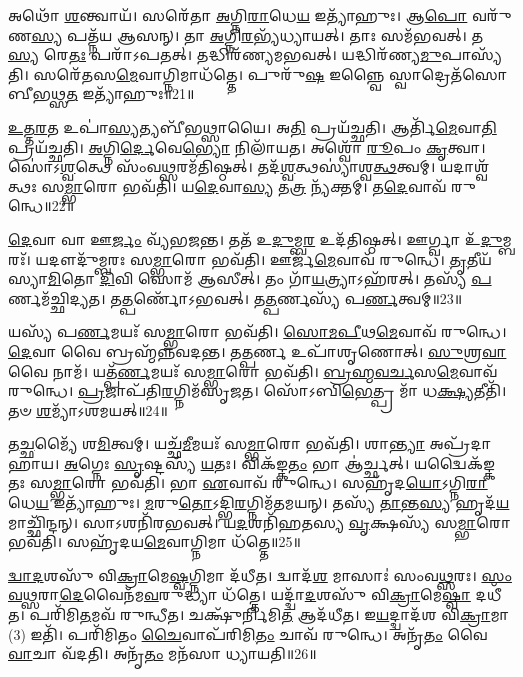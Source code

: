 𑌅𑌥𑍋᳴ \ul{𑌶}\-𑌨𑍍𑌤𑍍𑌵𑌾𑌯᳴।
𑌸𑌰𑍇᳴𑌤𑌾 \ul{𑌅}\-𑌗𑍍𑌨𑌿\-\ul{𑌰𑌾}\-𑌧𑍇\-\ul{𑌯} 𑌇𑌤𑍍𑌯𑌾᳴𑌹𑍁𑌃।
𑌆\-\ul{𑌪𑍋} 𑌵𑌰𑍁᳴𑌣\-\ul{𑌸𑍍𑌯} 𑌪𑌤𑍍𑌨᳴𑌯 𑌆𑌸𑌨𑍍।
𑌤𑌾 \ul{𑌅}\-𑌗𑍍𑌨𑌿\-\ul{𑌰}\-𑌭𑍍𑌯᳴𑌧𑍍𑌯𑌾𑌯𑌤𑍍।
𑌤𑌾𑌃 𑌸𑌮᳴𑌭𑌵𑌤𑍍।
𑌤\-\ul{𑌸𑍍𑌯} 𑌰𑍇\-\ul{𑌤𑌃} 𑌪𑌰𑌾᳴𑌽𑌪𑌤𑌤𑍍।
𑌤𑌦𑍍𑌧𑌿𑌰᳴𑌣𑍍𑌯𑌮𑌭𑌵𑌤𑍍।
𑌯𑌦𑍍𑌧𑌿𑌰᳴𑌣𑍍𑌯\-\ul{𑌮𑍁}\-𑌪𑌾𑌸𑍍𑌯᳴𑌤𑌿।
𑌸𑌰𑍇᳴𑌤𑌸\-\ul{𑌮𑍇}\-𑌵𑌾𑌗𑍍𑌨𑌿𑌮𑌾𑌧᳴𑌤𑍍𑌤𑍇।
𑌪𑍁𑌰𑍁᳴\-\ul{𑌷} 𑌇𑌨𑍍𑌨𑍍𑌵𑍈 𑌸𑍍𑌵𑌾𑌦𑍍𑌰𑍇𑌤᳴𑌸𑍋 𑌬𑍀𑌭𑌥𑍍𑌸\-\ul{𑌤} 𑌇𑌤𑍍𑌯𑌾᳴𑌹𑍁𑌃॥21॥

\-\ul{𑌉}\-\-\ul{𑌤𑍍𑌤}\-\-\ul{𑌰}\-𑌤 𑌉𑌪𑌾॑\-\ul{𑌸𑍍𑌯}\-𑌤𑍍𑌯𑌬𑍀᳴𑌭𑌥𑍍𑌸𑌾𑌯𑍈।
𑌅\-\ul{𑌤𑌿} 𑌪𑍍𑌰𑌯᳴𑌚𑍍𑌛𑌤𑌿।
𑌆𑌰𑍍𑌤𑌿᳴\-\ul{𑌮𑍇}\-𑌵𑌾\-\ul{𑌤𑌿} 𑌪𑍍𑌰𑌯᳴𑌚𑍍𑌛𑌤𑌿।
\-\ul{𑌅}\-𑌗𑍍𑌨𑌿\-\ul{𑌰𑍍𑌦𑍇}\-𑌵𑍇\-\ul{𑌭𑍍𑌯𑍋} 𑌨𑌿𑌲𑌾᳴𑌯𑌤।
𑌅𑌶𑍍𑌵𑍋᳴ \ul{𑌰𑍂}\-𑌪𑌂 \ul{𑌕𑍃}\-𑌤𑍍𑌵𑌾।
𑌸𑍋॑𑌽\-\ul{𑌶𑍍𑌵}\-𑌤𑍍𑌥𑍇 𑌸𑌂᳴𑌵\-\ul{𑌥𑍍𑌸}\-𑌰𑌮᳴𑌤𑌿𑌷𑍍𑌠𑌤𑍍।
𑌤𑌦᳴\-\ul{𑌶𑍍𑌵}\-𑌤𑍍𑌥𑌸𑍍𑌯𑌾॑𑌶𑍍𑌵\-\ul{𑌤𑍍𑌥}\-𑌤𑍍𑌵𑌮𑍍।
𑌯𑌦𑌾𑌶𑍍𑌵᳴𑌤𑍍𑌥𑌃 𑌸\-\ul{𑌮𑍍𑌭𑌾}\-𑌰𑍋 𑌭𑌵᳴𑌤𑌿।
𑌯\-\ul{𑌦𑍇}\-𑌵𑌾\-\ul{𑌸𑍍𑌯} 𑌤\-\ul{𑌤𑍍𑌰} 𑌨𑍍𑌯᳴𑌕𑍍𑌤𑌮𑍍।
𑌤\-\ul{𑌦𑍇}\-𑌵𑌾𑌵᳴ 𑌰𑍁𑌨𑍍𑌧𑍇॥22॥

\-\ul{𑌦𑍇}\-𑌵𑌾 𑌵𑌾 𑌊\-\ul{𑌰𑍍𑌜𑌂} 𑌵𑍍𑌯᳴𑌭𑌜𑌨𑍍𑌤।
𑌤𑌤᳴ 𑌉\-\ul{𑌦𑍁}\-𑌮𑍍𑌬\-\ul{𑌰} 𑌉𑌦᳴𑌤𑌿𑌷𑍍𑌠𑌤𑍍।
𑌊𑌰𑍍𑌗𑍍𑌵𑌾 𑌉᳴\-\ul{𑌦𑍁}\-𑌮𑍍𑌬𑌰𑌃᳴।
𑌯𑌦𑍗𑌦𑍁᳴𑌮𑍍𑌬𑌰𑌃 𑌸\-\ul{𑌮𑍍𑌭𑌾}\-𑌰𑍋 𑌭𑌵᳴𑌤𑌿।
𑌊𑌰𑍍𑌜᳴\-\ul{𑌮𑍇}\-𑌵𑌾𑌵᳴ 𑌰𑍁𑌨𑍍𑌧𑍇।
\-\ul{𑌤𑍃}\-𑌤𑍀𑌯᳴𑌸𑍍𑌯𑌾\-\ul{𑌮𑌿}\-𑌤𑍋 \ul{𑌦𑌿}\-𑌵𑌿 𑌸𑍋𑌮᳴ 𑌆𑌸𑍀𑌤𑍍।
𑌤𑌂 𑌗𑌾᳴\-\ul{𑌯}\-𑌤𑍍𑌰𑍍𑌯𑌾\-𑌽𑌹᳴𑌰𑌤𑍍।
𑌤𑌸𑍍𑌯᳴ \ul{𑌪}\-𑌰𑍍𑌣𑌮᳴𑌚𑍍𑌛𑌿𑌦𑍍𑌯𑌤।
𑌤\-\ul{𑌤𑍍𑌪}\-𑌰𑍍𑌣𑍋᳴\-𑌽𑌭𑌵𑌤𑍍।
𑌤\-\ul{𑌤𑍍𑌪}\-𑌰𑍍𑌣𑌸𑍍𑌯᳴ 𑌪\-\ul{𑌰𑍍𑌣}\-𑌤𑍍𑌵𑌮𑍍॥23॥

𑌯𑌸𑍍𑌯᳴ 𑌪\-\ul{𑌰𑍍𑌣}\-𑌮𑌯𑌃᳴ 𑌸\-\ul{𑌮𑍍𑌭𑌾}\-𑌰𑍋 𑌭𑌵᳴𑌤𑌿।
\-\ul{𑌸𑍋}\-\-\ul{𑌮}\-\-\ul{𑌪𑍀}\-𑌥\-\ul{𑌮𑍇}\-𑌵𑌾𑌵᳴ 𑌰𑍁𑌨𑍍𑌧𑍇।
\-\ul{𑌦𑍇}\-𑌵𑌾 𑌵𑍈 𑌬𑍍𑌰𑌹𑍍𑌮᳴𑌨𑍍𑌨𑌵𑌦𑌨𑍍𑌤।
𑌤\-\ul{𑌤𑍍𑌪}\-𑌰𑍍𑌣 𑌉𑌪𑌾᳴𑌶𑍃𑌣𑍋𑌤𑍍।
\-\ul{𑌸𑍁}\-𑌶𑍍𑌰\-\ul{𑌵𑌾} 𑌵𑍈 𑌨𑌾𑌮᳴।
𑌯𑌤𑍍𑌪᳴\-\ul{𑌰𑍍𑌣}\-𑌮𑌯𑌃᳴ 𑌸\-\ul{𑌮𑍍𑌭𑌾}\-𑌰𑍋 𑌭𑌵᳴𑌤𑌿।
\-\ul{𑌬𑍍𑌰}\-\-\ul{𑌹𑍍𑌮}\-\-\ul{𑌵}\-\-\ul{𑌰𑍍𑌚}\-𑌸\-\ul{𑌮𑍇}\-𑌵𑌾𑌵᳴ 𑌰𑍁𑌨𑍍𑌧𑍇।
\-\ul{𑌪𑍍𑌰}\-𑌜𑌾𑌪᳴𑌤𑌿\-\ul{𑌰}\-𑌗𑍍𑌨𑌿𑌮᳴\-𑌸𑍃𑌜𑌤।
𑌸𑍋᳴𑌽𑌬𑌿\-\ul{𑌭𑍇}\-𑌤𑍍𑌪𑍍𑌰 𑌮𑌾᳴ 𑌧\-\ul{𑌕𑍍𑌷𑍍𑌯}\-𑌤𑍀𑌤𑌿᳴।
𑌤𑍞 \ul{𑌶}\-𑌮𑍍𑌯𑌾᳴\-𑌽𑌶𑌮𑌯𑌤𑍍॥24॥

𑌤\-\ul{𑌚𑍍𑌛}\-𑌮𑍍𑌯𑍈᳴ 𑌶\-\ul{𑌮𑌿}\-𑌤𑍍𑌵𑌮𑍍।
𑌯𑌚𑍍𑌛᳴\-\ul{𑌮𑍀}\-𑌮𑌯𑌃᳴ 𑌸\-\ul{𑌮𑍍𑌭𑌾}\-𑌰𑍋 𑌭𑌵᳴𑌤𑌿।
𑌶𑌾\-\ul{𑌨𑍍𑌤𑍍𑌯𑌾} 𑌅𑌪𑍍𑌰᳴𑌦𑌾𑌹𑌾𑌯।
\-\ul{𑌅}\-𑌗𑍍𑌨𑍇𑌃 \ul{𑌸𑍃}\-𑌷𑍍𑌟𑌸𑍍𑌯᳴ \ul{𑌯}\-𑌤𑌃।
𑌵𑌿𑌕᳴𑌙𑍍𑌕\-\ul{𑌤𑌂} 𑌭𑌾 𑌆॑𑌰𑍍𑌚𑍍𑌛𑌤𑍍।
𑌯𑌦𑍍𑌵𑍈𑌕᳴𑌙𑍍𑌕𑌤𑌃 𑌸\-\ul{𑌮𑍍𑌭𑌾}\-𑌰𑍋 𑌭𑌵᳴𑌤𑌿।
𑌭𑌾 \ul{𑌏}\-𑌵𑌾𑌵᳴ 𑌰𑍁𑌨𑍍𑌧𑍇।
𑌸𑌹𑍃᳴𑌦\-\ul{𑌯𑍋}\-\-𑌽𑌗𑍍𑌨𑌿\-\ul{𑌰𑌾}\-𑌧𑍇\-\ul{𑌯} 𑌇𑌤𑍍𑌯𑌾᳴𑌹𑍁𑌃।
\-\ul{𑌮}\-𑌰𑍁\-\ul{𑌤𑍋}\-\-𑌽𑌦𑍍𑌭𑌿\-\ul{𑌰}\-𑌗𑍍𑌨𑌿𑌮᳴𑌤𑌮𑌯𑌨𑍍।
𑌤𑌸𑍍𑌯᳴ \ul{𑌤𑌾}\-𑌨𑍍𑌤\-\ul{𑌸𑍍𑌯} 𑌹𑍃𑌦᳴\-\ul{𑌯}\-𑌮𑌾𑌚𑍍𑌛𑌿᳴𑌨𑍍𑌦𑌨𑍍।
𑌸𑌾𑌽𑌶𑌨𑌿᳴𑌰𑌭𑌵𑌤𑍍।
𑌯\-\ul{𑌦}\-𑌶𑌨𑌿᳴𑌹𑌤𑌸𑍍𑌯 \ul{𑌵𑍃}\-𑌕𑍍𑌷𑌸𑍍𑌯᳴ 𑌸\-\ul{𑌮𑍍𑌭𑌾}\-𑌰𑍋 𑌭𑌵᳴𑌤𑌿।
𑌸𑌹𑍃᳴𑌦𑌯\-\ul{𑌮𑍇}\-𑌵𑌾𑌗𑍍𑌨𑌿𑌮𑌾 𑌧᳴𑌤𑍍𑌤𑍇॥25॥

\-\ul{𑌦𑍍𑌵𑌾}\-\-\ul{𑌦}\-𑌶𑌸𑍁᳴ 𑌵𑌿\-\ul{𑌕𑍍𑌰𑌾}\-𑌮𑍇\-\ul{𑌷𑍍𑌵}\-𑌗𑍍𑌨𑌿𑌮𑌾 𑌦᳴𑌧𑍀𑌤।
𑌦𑍍𑌵𑌾𑌦᳴\-\ul{𑌶} 𑌮𑌾𑌸𑌾𑌃॑ 𑌸𑌂𑌵\-\ul{𑌥𑍍𑌸}\-𑌰𑌃।
\-\ul{𑌸𑌂}\-\-\ul{𑌵}\-\-\ul{𑌥𑍍𑌸}\-𑌰𑌾\-\ul{𑌦𑍇}\-𑌵𑍈𑌨᳴𑌮\-\ul{𑌵}\-𑌰𑍁𑌦𑍍𑌧𑍍𑌯𑌾 𑌧᳴𑌤𑍍𑌤𑍇।
𑌯𑌦𑍍𑌦𑍍𑌵𑌾᳴\-\ul{𑌦}\-𑌶𑌸𑍁᳴ 𑌵𑌿\-\ul{𑌕𑍍𑌰𑌾}\-𑌮𑍇\-\ul{𑌷𑍍𑌵𑌾} 𑌦𑌧𑍀᳴𑌤।
𑌪𑌰𑌿᳴𑌮𑌿\-\ul{𑌤}\-𑌮𑌵᳴ 𑌰𑍁𑌨𑍍𑌧𑍀𑌤।
𑌚𑌕𑍍𑌷𑍁᳴𑌰𑍍𑌨𑌿𑌮𑌿\-\ul{𑌤} 𑌆𑌦᳴𑌧𑍀𑌤।
𑌇\-\ul{𑌯}\-𑌦𑍍𑌦𑍍𑌵𑌾𑌦᳴𑌶 𑌵𑌿\-\ul{𑌕𑍍𑌰𑌾}\-𑌮𑌾(3) 𑌇𑌤𑌿᳴।
𑌪𑌰𑌿᳴𑌮𑌿𑌤𑌂 \ul{𑌚𑍈}\-𑌵𑌾𑌪᳴𑌰𑌿𑌮𑌿\-\ul{𑌤𑌂} 𑌚𑌾𑌵᳴ 𑌰𑍁𑌨𑍍𑌧𑍇।
𑌅𑌨𑍃᳴\-\ul{𑌤𑌂} 𑌵𑍈 \ul{𑌵𑌾}\-𑌚𑌾 𑌵᳴𑌦𑌤𑌿।
𑌅𑌨𑍃᳴\-\ul{𑌤𑌂} 𑌮𑌨᳴𑌸𑌾 𑌧𑍍𑌯𑌾𑌯𑌤𑌿॥26॥

